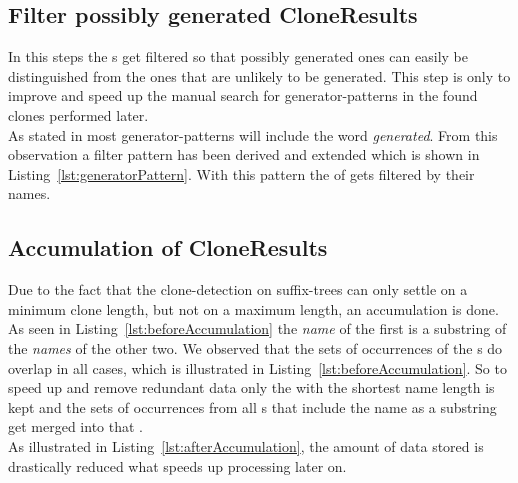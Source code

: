 \subsection{Filter possibly generated CloneResults}
\label{section:filterCloneResults}
In this steps the s get filtered so that possibly generated ones can easily be distinguished from the ones that are unlikely to be generated. This step is only to improve and speed up the manual search for generator-patterns in the found clones performed later.\\
As stated in \cite{Bernwieser2014} most generator-patterns will include the word \textit{generated}. From this observation a filter pattern has been derived and extended which is shown in Listing~\ref{lst:generatorPattern}. With this pattern the  of  gets filtered by their names.


\subsection{Accumulation of CloneResults}
\label{section:accumulation}
Due to the fact that the clone-detection on suffix-trees can only settle on a minimum clone length, but not on a maximum length, an accumulation is done.\\
As seen in Listing~\ref{lst:beforeAccumulation} the \textit{name} of the first  is a substring of the \textit{names} of the other two. We observed that the sets of occurrences of the s do overlap in all cases, which is illustrated in Listing~\ref{lst:beforeAccumulation}. So to speed up and remove redundant data only the  with the shortest name length is kept and the sets of occurrences from all s that include the name as a substring get merged into that .\\
As illustrated in Listing~\ref{lst:afterAccumulation}, the amount of data stored is drastically reduced what speeds up processing later on.



